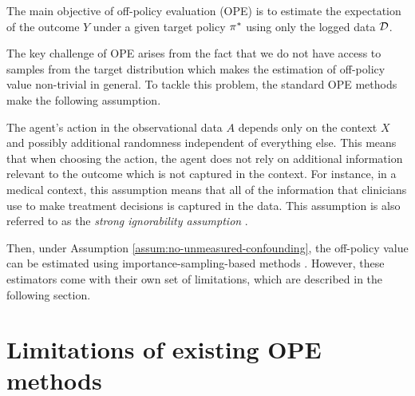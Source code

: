 \begin{importantresultwithtitle}[title=Off-policy evaluation (OPE)]\noindent
    The main objective of off-policy evaluation (OPE) is to estimate the expectation of the outcome $Y$ under a given target policy $\pi^*$ using only the logged data $\mathcal{D}$.
\end{importantresultwithtitle}

The key challenge of OPE arises from the fact that we do not
have access to samples from the target distribution which makes the estimation of off-policy value non-trivial in general.
To tackle this problem, the standard OPE methods make the following assumption.

\begin{assumption}\label{assum:no-unmeasured-confounding}
    The agent's action in the observational data $A$ depends only on the context $X$ and possibly additional randomness independent of everything else. This means that when choosing the action, the agent does not rely on additional information relevant to the outcome which is not captured in the context. For instance, in a medical context, this assumption means that all of the information that clinicians use to make treatment decisions is captured in the data. This assumption is also referred to as the \emph{strong ignorability assumption} \citep{tsiatis2019dynamic}.
\end{assumption}

Then, under Assumption \ref{assum:no-unmeasured-confounding}, the off-policy value can be estimated using importance-sampling-based methods \citep{horvitz1952generalization}. 
However, these estimators come with their own set of limitations, which are described in the following section. 

\section{Limitations of existing OPE methods}
